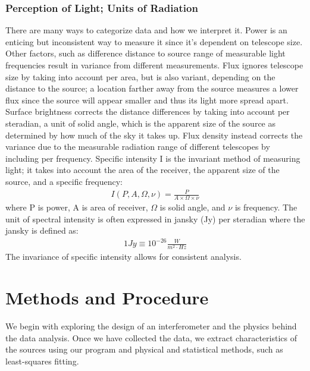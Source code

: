 \documentclass{article}
\begin{document}
\subsubsection{Perception of Light; Units of Radiation}
There are many ways to categorize data and how we interpret it. Power is
an enticing but inconsistent way to measure it since it's dependent on
telescope size. Other factors, such as difference distance to source
range of measurable light frequencies result in variance from different 
measurements. Flux ignores telescope size by taking into account per
area, but is also variant, depending on the distance to the source; a 
location farther away from the source measures a lower flux since the 
source will appear smaller and thus its light more spread apart. Surface
brightness corrects the distance differences by taking into account per
steradian, a unit of solid angle, which is the apparent size of the
source as determined by how much of the sky it takes up. Flux density
instead corrects the variance due to the measurable radiation range of
different telescopes by including per frequency. Specific intensity I is
the invariant method of measuring light; it takes into account the area
of the receiver, the apparent size of the source, and a specific
frequency: 
\begin{align}I(P,A,\Omega,\nu) =
  \frac{P}{A\times\Omega\times\nu}\end{align}
where P is power, A is area of receiver, $\Omega$ is solid angle, and
$\nu$ is frequency. The unit of spectral intensity is often expressed in
jansky (Jy) per steradian where the jansky is defined as:
\begin{align}1 Jy \equiv 10^{-26}\frac{W}{m^{2}\cdot{Hz}}\end{align} 
The invariance of specific intensity allows for consistent analysis. 
\section{Methods and Procedure}
We begin with exploring the design of an interferometer and the
physics behind the data analysis. Once we have collected the data, we 
extract characteristics of the sources using our program and physical 
and statistical methods, such as least-squares fitting. 
\end{document}
